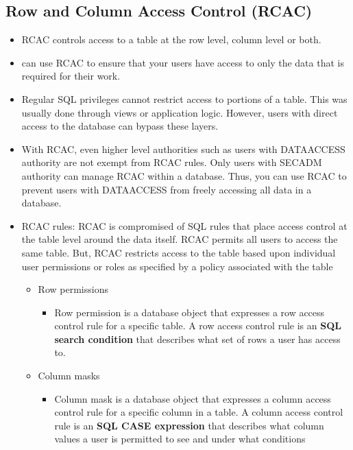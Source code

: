 \documentclass{article}
\begin{document}
\subsection{Row and Column Access Control (RCAC)}
\begin{itemize}
\item RCAC controls access to a table at the row level, column level or both.
\item can use RCAC to ensure that your users have access to only the data that is required for their
work.
\item Regular SQL privileges cannot restrict access to portions of a table. This was usually done through
views or application logic. However, users with direct access to the database can bypass these layers.
\item With RCAC, even higher level authorities such as users with DATAACCESS authority are not exempt
from RCAC rules. Only users with SECADM authority can manage RCAC within a database. Thus, you can use
RCAC to prevent users with DATAACCESS from freely accessing all data in a database.
\item RCAC rules:
RCAC is compromised of SQL rules that place access control at the table level around the data itself. RCAC
permits all users to access the same table. But, RCAC restricts access to the table based upon individual
user permissions or roles as specified by a policy associated with the table
	\begin{itemize}
	\item Row permissions
		\begin{itemize}
		\item Row permission is a database object that expresses a row access control rule
	for a specific table. A row access control rule is an \textbf{SQL search condition} that describes
	what set of rows a user has access to.
		\end{itemize}
	\item Column masks
		\begin{itemize}
		\item Column mask is a database object that expresses a column access control rule for a specific
		column in a table. A column access control rule is an \textbf{SQL CASE expression} that describes
		what column values a user is permitted to see and under what conditions
		\end{itemize}
	\end{itemize}
\end{itemize}
\end{document}
